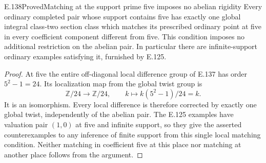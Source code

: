 \begin{result}{E.138}{Proved}{Matching at the support prime five imposes no abelian rigidity}
Every ordinary completed pair whose support contains five has exactly
one global integral class-two section class which matches its prescribed
ordinary point at five in every coefficient component different from
five. This condition imposes no additional restriction on the abelian
pair. In particular there are infinite-support ordinary examples
satisfying it, furnished by E.125.
\end{result}
\begin{proof}
At five the entire off-diagonal local difference group of E.137 has
order $5^2-1=24$. Its localization map from the global twist group is
\[
 \mathbb Z/24\longrightarrow\mathbb Z/24,\qquad
 k\longmapsto k(5^2-1)/24=k.
\]
It is an isomorphism. Every local difference is therefore corrected
by exactly one global twist, independently of the abelian pair.
The E.125 examples have valuation pair $(1,0)$ at five and infinite
support, so they give the asserted counterexamples to any inference
of finite support from this single local matching condition.
Neither matching in coefficient five at this place nor matching at
another place follows from the argument.
\end{proof}


